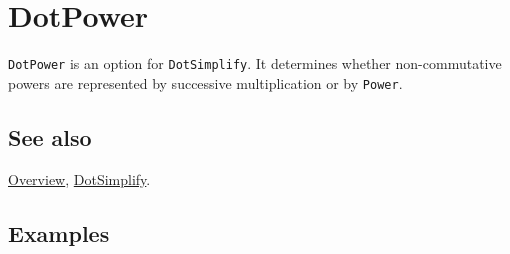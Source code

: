 \documentclass[../FeynCalcManual.tex]{subfiles}
\begin{document}
\hypertarget{dotpower}{
\section{DotPower}\label{dotpower}}

\texttt{DotPower} is an option for \texttt{DotSimplify}. It determines
whether non-commutative powers are represented by successive
multiplication or by \texttt{Power}.

\subsection{See also}

\hyperlink{toc}{Overview}, \hyperlink{dotsimplify}{DotSimplify}.

\subsection{Examples}
\end{document}
